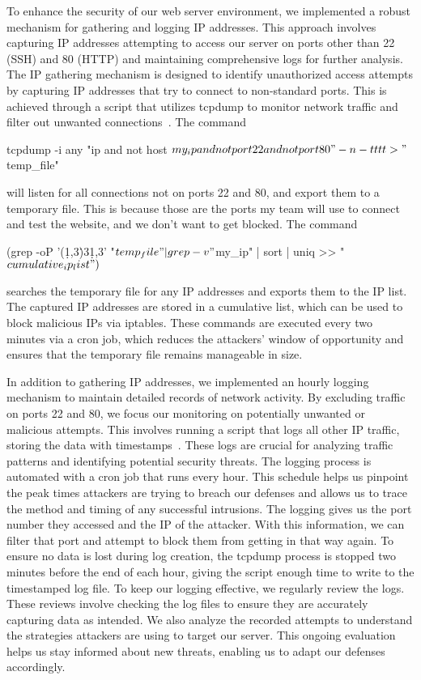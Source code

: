 To enhance the security of our web server environment, we implemented a robust mechanism for gathering and logging IP addresses. This approach involves capturing IP addresses attempting to access our server on ports other than 22 (SSH) and 80 (HTTP) and maintaining comprehensive logs for further analysis. The IP gathering mechanism is designed to identify unauthorized access attempts by capturing IP addresses that try to connect to non-standard ports. This is achieved through a script that utilizes tcpdump to monitor network traffic and filter out unwanted connections~\cite{TechTarget_Net}. The command


tcpdump -i any "ip and not host $my_ip and not port 22 and not port 80" -n -tttt > "$temp_file"


will listen for all connections not on ports 22 and 80, and export them to a temporary file. This is because those are the ports my team will use to connect and test the website, and we don't want to get blocked. The command

(grep -oP '(\d{1,3}\.){3}\d{1,3}' "$temp_file" | grep -v "$my_ip" | sort | uniq >> "$cumulative_ip_list")$


searches the temporary file for any IP addresses and exports them to the IP list. The captured IP addresses are stored in a cumulative list, which can be used to block malicious IPs via iptables. These commands are executed every two minutes via a cron job, which reduces the attackers' window of opportunity and ensures that the temporary file remains manageable in size.

In addition to gathering IP addresses, we implemented an hourly logging mechanism to maintain detailed records of network activity. By excluding traffic on ports 22 and 80, we focus our monitoring on potentially unwanted or malicious attempts. This involves running a script that logs all other IP traffic, storing the data with timestamps~\cite{Schwartz_TCPDUMP}. These logs are crucial for analyzing traffic patterns and identifying potential security threats. The logging process is automated with a cron job that runs every hour. This schedule helps us pinpoint the peak times attackers are trying to breach our defenses and allows us to trace the method and timing of any successful intrusions. The logging gives us the port number they accessed and the IP of the attacker. With this information, we can filter that port and attempt to block them from getting in that way again. To ensure no data is lost during log creation, the tcpdump process is stopped two minutes before the end of each hour, giving the script enough time to write to the timestamped log file. To keep our logging effective, we regularly review the logs. These reviews involve checking the log files to ensure they are accurately capturing data as intended. We also analyze the recorded attempts to understand the strategies attackers are using to target our server. This ongoing evaluation helps us stay informed about new threats, enabling us to adapt our defenses accordingly.

